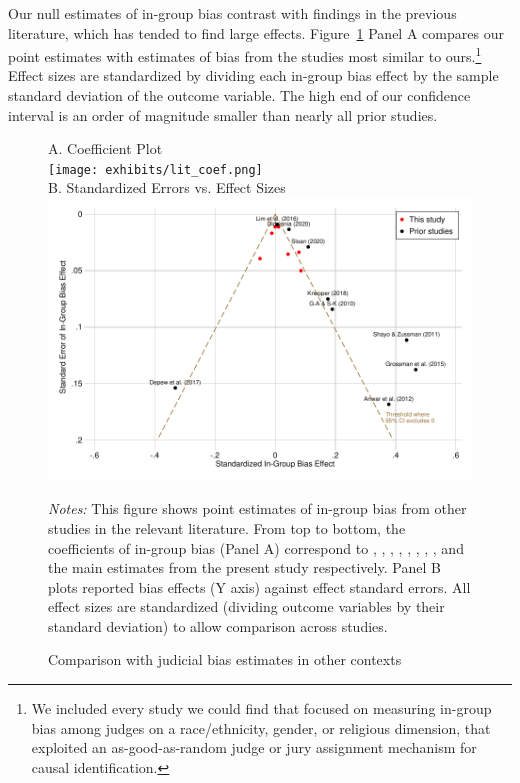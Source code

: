 \documentclass[12pt,english]{article}
\begin{document}
Our null estimates of in-group bias contrast with findings in the previous literature, which has tended to find large effects. Figure~\ref{fig:literature} Panel A compares our point estimates with estimates of bias from the studies most similar to ours.\footnote{We included every study we could find that focused on measuring in-group bias among judges on a race/ethnicity, gender, or religious dimension, that exploited an as-good-as-random judge or jury assignment mechanism for causal identification.} Effect sizes are standardized by dividing each in-group bias effect by the sample standard deviation of the outcome variable. The high end of our confidence interval is an order of magnitude smaller than nearly all prior studies.

\begin{figure}%
  \begin{center}
    \caption{Comparison with judicial bias estimates in other contexts}
    \label{fig:literature}
    A. Coefficient Plot \\ 
    \texttt{[image: exhibits/lit\_coef.png]} \\ 
    \vspace{1cm}
    B. Standardized Errors vs. Effect Sizes \\ 
    \includegraphics[scale=0.8]{exhibits/pub_bias.pdf} \\
  \end{center}
   \begin{minipage}{1.0\textwidth}
   \footnotesize \emph{Notes:} This figure shows point estimates of in-group bias from other studies in the relevant literature. From top to bottom, the coefficients of in-group bias (Panel A) correspond to \cite{ShayoZussman2011QJE}, \cite{AnwarBayerHjalmarsson2012TQJoE}, 
    \cite{depew2017judges},
   \cite{knepper2018shadow}, \cite{sloane2019racial}, \cite{Didwania2018CLE}, \cite{lim2016judges}, 
   \cite{gazal2010let}, and the main estimates from the present study respectively. Panel B plots reported bias effects (Y axis) against effect standard errors. All effect sizes are standardized (dividing outcome variables by their standard deviation) to allow comparison across studies.
   \par 
   \end{minipage}
\end{figure}
\end{document}
